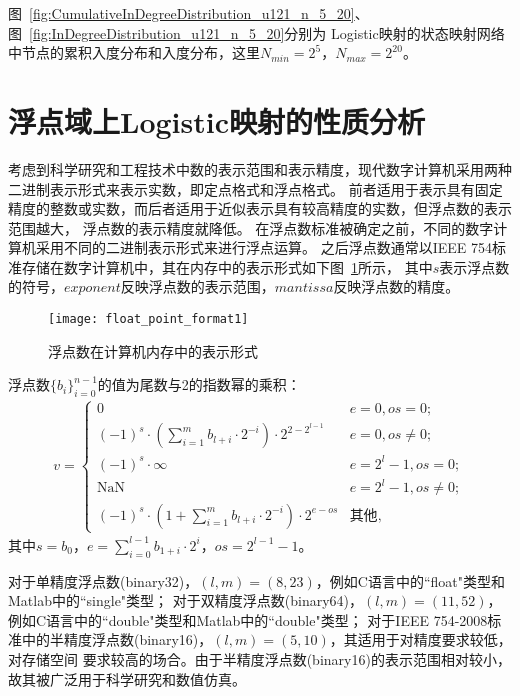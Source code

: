 图~\ref{fig:CumulativeInDegreeDistribution_u121_n_5_20}、图~\ref{fig:InDegreeDistribution_u121_n_5_20}分别为
Logistic映射的状态映射网络中节点的累积入度分布和入度分布，这里$N_{min}=2^{5}$，$N_{max}=2^{20}$。

\section{浮点域上Logistic映射的性质分析}

考虑到科学研究和工程技术中数的表示范围和表示精度，现代数字计算机采用两种二进制表示形式来表示实数，即定点格式和浮点格式。
前者适用于表示具有固定精度的整数或实数，而后者适用于近似表示具有较高精度的实数，但浮点数的表示范围越大， 浮点数的表示精度就降低。
在浮点数标准被确定之前，不同的数字计算机采用不同的二进制表示形式来进行浮点运算。
之后浮点数通常以IEEE 754标准存储在数字计算机中，其在内存中的表示形式如下图~\ref{fig:IEEE_float}所示，
其中$s$表示浮点数的符号，$exponent$反映浮点数的表示范围，$mantissa$反映浮点数的精度。
\begin{figure}[!htb]
\centering
\texttt{[image: float\_point\_format1]}
\caption{浮点数在计算机内存中的表示形式}
\label{fig:IEEE_float}
\end{figure}

浮点数$\{b_i\}_{i=0}^{n-1}$的值为尾数与2的指数幂的乘积：
\begin{eqnarray*}
v=
\begin{cases}
  0                                                                              & e=0, \mathit{os}=0;        \\
  (-1)^{s}\cdot \left(\sum\limits_{i=1}^m b_{l+i}   \cdot 2^{-i}\right)\cdot 2^{2-2^{l-1}}  & e=0, \mathit{os}\neq 0;    \\
  (-1)^{s}\cdot \infty                                                           & e=2^l-1, \mathit{os}=0;    \\
  \mbox{NaN}                                                         & e=2^l-1, \mathit{os}\neq 0; \\
  (-1)^{s}\cdot \left(1+\sum\limits_{i=1}^{m} b_{l+i} \cdot 2^{-i} \right)\cdot 2^{e-\mathit{os}}
                                                                                 & \text{其他},
\end{cases}
\end{eqnarray*}
其中$s=b_0$，$e=\sum\limits_{i=0}^{l-1} b_{1+i} \cdot 2^{i}$，$\mathit{os}=2^{l-1}-1$。

对于单精度浮点数(binary32)，$(l, m)=(8, 23)$，例如C语言中的``float"类型和Matlab中的``single"类型；
对于双精度浮点数(binary64)，$(l, m)=(11, 52)$，例如C语言中的``double"类型和Matlab中的``double"类型；
对于IEEE 754-2008标准中的半精度浮点数(binary16)，$(l, m)=(5, 10)$，其适用于对精度要求较低，对存储空间
要求较高的场合。由于半精度浮点数(binary16)的表示范围相对较小，故其被广泛用于科学研究和数值仿真。

